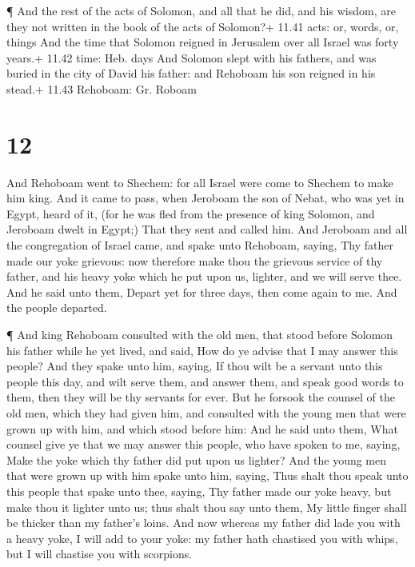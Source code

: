  ¶ And the rest of the acts of Solomon, and all that he
did, and his wisdom, are they not written in the book of the acts of
Solomon?+ 11.41 acts: or, words, or, things  And the time
that Solomon reigned in Jerusalem over all Israel was forty years.+
11.42 time: Heb. days  And Solomon slept with his fathers,
and was buried in the city of David his father: and Rehoboam his son
reigned in his stead.+ 11.43 Rehoboam: Gr. Roboam

\hypertarget{section-11}{%
\section{12}\label{section-11}}

 And Rehoboam went to Shechem: for all Israel were come to
Shechem to make him king.  And it came to pass, when
Jeroboam the son of Nebat, who was yet in Egypt, heard of it, (for he
was fled from the presence of king Solomon, and Jeroboam dwelt in
Egypt;)  That they sent and called him. And Jeroboam and all
the congregation of Israel came, and spake unto Rehoboam, saying,
 Thy father made our yoke grievous: now therefore make thou
the grievous service of thy father, and his heavy yoke which he put upon
us, lighter, and we will serve thee.  And he said unto them,
Depart yet for three days, then come again to me. And the people
departed.

 ¶ And king Rehoboam consulted with the old men, that stood
before Solomon his father while he yet lived, and said, How do ye advise
that I may answer this people?  And they spake unto him,
saying, If thou wilt be a servant unto this people this day, and wilt
serve them, and answer them, and speak good words to them, then they
will be thy servants for ever.  But he forsook the counsel
of the old men, which they had given him, and consulted with the young
men that were grown up with him, and which stood before him:
 And he said unto them, What counsel give ye that we may
answer this people, who have spoken to me, saying, Make the yoke which
thy father did put upon us lighter?  And the young men that
were grown up with him spake unto him, saying, Thus shalt thou speak
unto this people that spake unto thee, saying, Thy father made our yoke
heavy, but make thou it lighter unto us; thus shalt thou say unto them,
My little finger shall be thicker than my father's loins. 
And now whereas my father did lade you with a heavy yoke, I will add to
your yoke: my father hath chastised you with whips, but I will chastise
you with scorpions.

